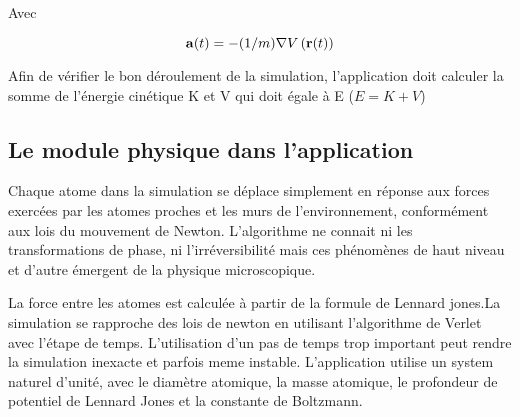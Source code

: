 Avec 

\begin{displaymath} {\bf a} (t) = - (1/m) {\bf\nabla} V\left( {\bf r}(t) \right) \end{displaymath}

Afin de vérifier le bon déroulement de la simulation, l'application doit calculer la somme de l'énergie cinétique K et  V qui doit égale à E  ($ E = K + V $)
\subsection{Le module physique dans l'application}
Chaque atome dans la simulation se déplace simplement en réponse aux forces exercées par les atomes proches et les murs de l'environnement, conformément aux lois du mouvement de Newton. L'algorithme ne connait ni les transformations de phase, ni l'irréversibilité mais ces phénomènes de haut niveau et d'autre émergent de la physique microscopique.

La force entre les atomes est calculée à partir de la formule de Lennard jones.La simulation se rapproche des lois de newton en utilisant l'algorithme de Verlet avec l'étape de temps. L'utilisation d'un pas de temps trop important peut rendre la simulation inexacte et parfois meme instable.
L'application utilise un system naturel d'unité, avec le diamètre atomique, la masse atomique, le profondeur de potentiel de Lennard Jones et la constante de Boltzmann.

